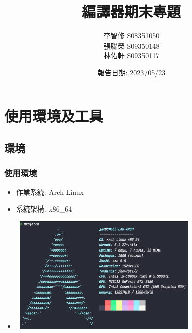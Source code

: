 \documentclass{beamer}
\title{\textbf{編譯器期末專題}  }
\author{
    \item 李智修 S08351050
    \item 張聯榮 S09350148
    \item 林佑軒 S09350117
}
\date{報告日期: 2023/05/23}
\begin{document}
{

    \begin{frame}
        \titlepage %
    \end{frame}
} %

\begin{frame}
\tableofcontents %
\end{frame}

\section{使用環境及工具} %
\subsection{環境}
\begin{frame}
  \frametitle{使用環境}
  \begin{itemize}
    \item 作業系統: Arch Linux %
    \item 系統架構: x86\_64
    \item 
\includegraphics[width=260pt,height=160pt]{images/OS_INFO.png}
  \end{itemize}
\end{frame}
\end{document}
